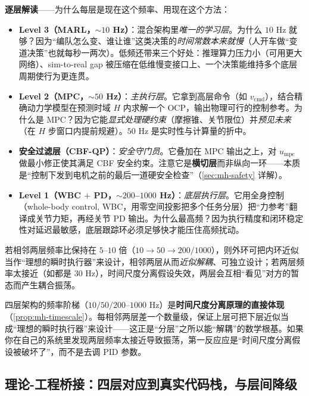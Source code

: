 \noindent\textbf{逐层解读}——为什么每层是现在这个频率、用现在这个方法：
\begin{itemize}
  \item \textbf{Level 3（MARL，$\sim 10$ Hz）}：混合架构里\emph{唯一的学习层}。为什么 $10$ Hz 就够？因为“编队怎么变、谁让谁”这类决策的\emph{时间常数本来就慢}（人开车做“变道决策”也就每秒一两次）。低频还带来三个好处：推理算力压力小（可用更大网络）、sim-to-real gap 被压缩在低维慢变接口上、一个决策能维持多个底层周期使行为更连贯。
  \item \textbf{Level 2（MPC，$\sim 50$ Hz）}：\emph{主执行层}。它拿到高层命令（如 $v_{\text{cmd}}$），结合精确动力学模型在预测时域 $H$ 内求解一个 OCP，输出物理可行的控制参考。为什么是 MPC？因为它能\emph{显式处理硬约束}（摩擦锥、关节限位）并\emph{预见未来}（在 $H$ 步窗口内提前规避）。$50$ Hz 是实时性与计算量的折中。
  \item \textbf{安全过滤层（CBF-QP）}：\emph{安全守门员}。它叠加在 MPC 输出之上，对 $u_{\text{mpc}}$ 做最小修正使其满足 CBF 安全约束。注意它是\textbf{横切层}而非纵向一环——本质是“控制下发到电机之前的最后一道硬安全检查”（\cref{sec:mh-safety} 详解）。
  \item \textbf{Level 1（WBC $+$ PD，$\sim 200$--$1000$ Hz）}：\emph{底层执行层}。它用全身控制（whole-body control, WBC，用零空间投影把多个任务分层）把“力参考”翻译成关节力矩，再经关节 PD 输出。为什么最高频？因为执行精度和闭环稳定性对延迟最敏感，底层跟踪环必须足够快才能压住高频扰动。
\end{itemize}

\begin{proposition}[时间尺度分离对频率阶梯的约束]\label{prop:mh-timescale}
若相邻两层频率比保持在 $5$--$10$ 倍（$10\to 50\to 200/1000$），则外环可把内环近似当作“理想的瞬时执行器”来设计，相邻两层从而\emph{近似解耦}、可独立设计；若两层频率太接近（如都是 $30$ Hz），时间尺度分离假设失效，两层会互相“看见”对方的暂态而产生耦合振荡。
\end{proposition}

\begin{insight}[频率阶梯不是拍脑袋定的]
四层架构的频率阶梯（$10/50/200$--$1000$ Hz）是\textbf{时间尺度分离原理的直接体现}（\cref{prop:mh-timescale}）。每相邻两层差一个数量级，保证上层可把下层近似当成“理想的瞬时执行器”来设计——这正是“分层”之所以能“解耦”的数学根基。如果你在自己的系统里发现两层频率太接近导致振荡，第一反应应是“时间尺度分离假设被破坏了”，而不是去调 PID 参数。
\end{insight}

\subsection{理论-工程桥接：四层对应到真实代码栈，与层间降级}
\label{sec:mh-stack-impl}

